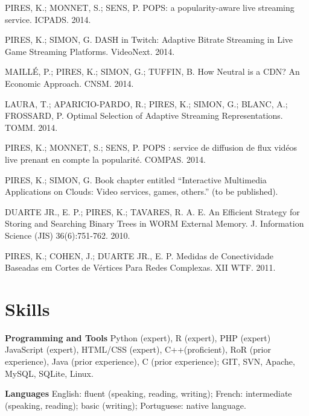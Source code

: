 \documentclass[margin,centered,10pt]{resume}
\begin{document}
\begin{resume}
    \small{
    \begin{list3}
        \item PIRES, K.; MONNET, S.; SENS, P. POPS: a popularity-aware live streaming service. ICPADS. 2014.
        \item PIRES, K.; SIMON, G. DASH in Twitch: Adaptive Bitrate Streaming in Live Game Streaming Platforms. VideoNext. 2014.
        \item MAILLÉ, P.; PIRES, K.; SIMON, G.; TUFFIN, B. How Neutral is a CDN? An Economic Approach. CNSM. 2014.
        \item LAURA, T.; APARICIO-PARDO, R.; PIRES, K.; SIMON, G.; BLANC, A.; FROSSARD, P. Optimal Selection of Adaptive Streaming Representations. TOMM. 2014.
        \item PIRES, K.; MONNET, S.; SENS, P. POPS : service de diffusion de flux vidéos live prenant en compte la popularité. COMPAS. 2014.
        \item PIRES, K.; SIMON, G. Book chapter entitled “Interactive Multimedia Applications on Clouds: Video services, games, others.” (to be published).
        \item DUARTE JR., E. P.; PIRES, K.; TAVARES, R. A. E. An Efficient Strategy for Storing and Searching Binary Trees in WORM External Memory. J. Information Science (JIS) 36(6):751-762. 2010.
        \item PIRES, K.; COHEN, J.; DUARTE JR., E. P. Medidas de Conectividade Baseadas em Cortes de Vértices Para Redes Complexas. XII WTF. 2011.
    \end{list3}
    }
    \vspace{1.5mm}%
    \sectionline
    \vspace{-3mm}%


    \section{\mysidestyle \textcolor{resumecolor}{Skills}}

    \textbf{Programming and Tools} Python (expert), R (expert), PHP (expert) JavaScript (expert), HTML/CSS (expert), C++(proficient), RoR (prior experience), Java (prior experience), C (prior experience); GIT, SVN, Apache, MySQL, SQLite, Linux.
    
    \vspace{-0.4cm}
    \textbf{Languages} English: fluent (speaking, reading, writing); French: intermediate (speaking, reading); basic (writing); Portuguese: native language.

\end{resume}
\end{document}
